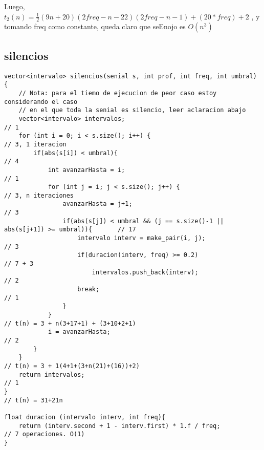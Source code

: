 \documentclass{article}
\begin{document}
Luego,
$t_2(n) = \frac{1}{2} (9 n + 20) (2 freq - n - 22) (2 freq - n - 1) + (20*freq) + 2$
, y tomando freq como constante, queda claro que seEnojo es $O(n^3)$

\newpage
\subsection{silencios}

\begin{lstlisting}
vector<intervalo> silencios(senial s, int prof, int freq, int umbral) {
    // Nota: para el tiemo de ejecucion de peor caso estoy considerando el caso
    // en el que toda la senial es silencio, leer aclaracion abajo
    vector<intervalo> intervalos;                                                       // 1
    for (int i = 0; i < s.size(); i++) {                                                // 3, 1 iteracion
        if(abs(s[i]) < umbral){                                                         // 4
            int avanzarHasta = i;                                                       // 1
            for (int j = i; j < s.size(); j++) {                                        // 3, n iteraciones
                avanzarHasta = j+1;                                                     // 3
                if(abs(s[j]) < umbral && (j == s.size()-1 || abs(s[j+1]) >= umbral)){       // 17
                    intervalo interv = make_pair(i, j);                                 // 3
                    if(duracion(interv, freq) >= 0.2)                                   // 7 + 3
                        intervalos.push_back(interv);                                   // 2
                    break;                                                              // 1
                }
            }                                                                           // t(n) = 3 + n(3+17+1) + (3+10+2+1)
            i = avanzarHasta;                                                           // 2
        }
    }                                                                                   // t(n) = 3 + 1(4+1+(3+n(21)+(16))+2)
    return intervalos;                                                                  // 1
}                                                                                       // t(n) = 31+21n

float duracion (intervalo interv, int freq){
    return (interv.second + 1 - interv.first) * 1.f / freq;                             // 7 operaciones. O(1)
}
\end{lstlisting}
\end{document}
